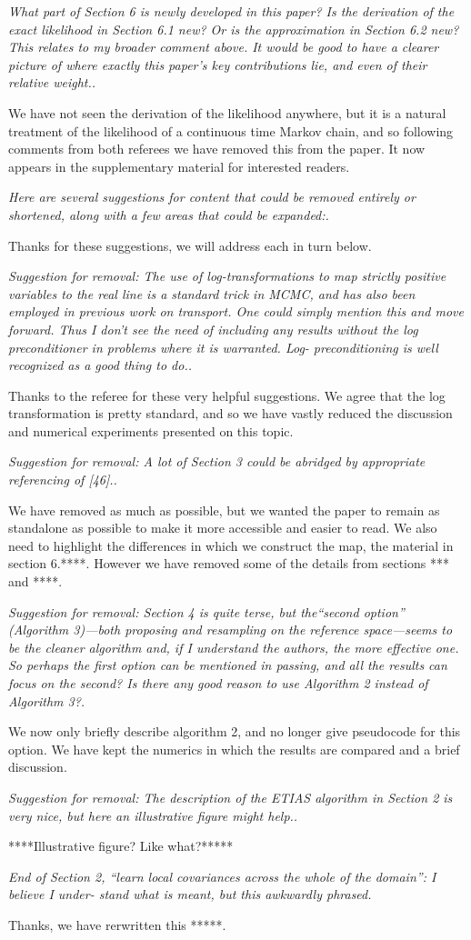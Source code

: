 \documentclass{article}
\newcommand{\comment}[2]{\vspace{0.6cm}{\bf Comment:} {\it #1.}

\vspace{0.3cm}{\bf Answer:} #2}
\begin{document}
\comment{What part of Section 6 is newly developed in this paper? Is the derivation of the exact likelihood in Section 6.1 new? Or is the approximation in Section 6.2 new? This relates to my broader comment above. It would be good to have a clearer picture of where exactly this paper’s key contributions lie, and even of their relative weight.}{We have not seen the derivation of the likelihood anywhere, but it is a natural treatment of the likelihood of a continuous time Markov chain, and so following comments from both referees we have removed this from the paper. It now appears in the supplementary material for interested readers.}

\comment{Here are several suggestions for content that could be removed entirely or shortened, along with a few areas that could be expanded:}{Thanks for these suggestions, we will address each in turn below.}

\comment{Suggestion for removal: The use of log-transformations to map strictly positive variables to the real line is a standard trick in MCMC, and has also been employed in previous work on transport. One could simply mention this and move forward. Thus I don’t see the need of including any results without the log preconditioner in problems where it is warranted. Log- preconditioning is well recognized as a good thing to do.}{Thanks to the referee for these very helpful suggestions. We agree that the log transformation is pretty standard, and so we have vastly reduced the discussion and numerical experiments presented on this topic.}


\comment{Suggestion for removal: A lot of Section 3 could be abridged by appropriate referencing of [46].}{
We have removed as much as possible, but we wanted the paper to remain as standalone as possible to make it more accessible and easier to read. We also need to highlight the differences in which we construct the map, the material in section 6.****. However we have removed some of the details from sections *** and ****.}

\comment{Suggestion for removal: Section 4 is quite terse, but the“second option” (Algorithm 3)—both proposing and resampling on the reference space—seems to be the cleaner algorithm and, if I understand the authors, the more effective one. So perhaps the first option can be mentioned in passing, and all the results can focus on the second? Is there any good reason to use Algorithm 2 instead of Algorithm 3?}{
We now only briefly describe algorithm 2, and no longer give pseudocode for this option. We have kept the numerics in which the results are compared and a brief discussion.}

\comment{Suggestion for removal: The description of the ETIAS algorithm in Section 2 is very nice, but here an illustrative figure might help.}{****Illustrative figure? Like what?*****}


\comment{End of Section 2, “learn local covariances across the whole of the domain”: I believe I under- stand what is meant, but this awkwardly phrased}{Thanks, we have rerwritten this *****.}
\end{document}
